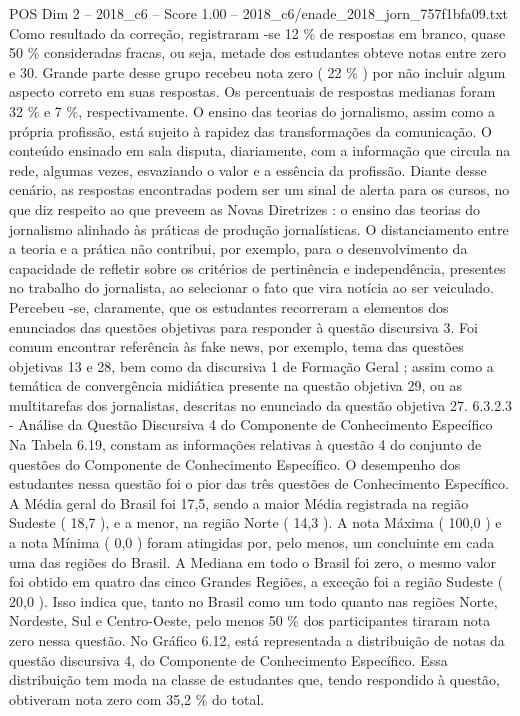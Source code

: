 \begin{textsample}{POS Dim 2 – 2018\_c6 – Score 1.00 – 2018\_c6/enade\_2018\_jorn\_757f1bfa09.txt}
Como resultado da correção, registraram -se 12 \% de respostas em branco, quase 50 \% consideradas fracas, ou seja, metade dos estudantes obteve notas entre zero e 30.
Grande parte desse grupo recebeu nota zero ( 22 \% ) por não incluir algum aspecto correto em suas respostas.
Os percentuais de respostas medianas foram 32 \% e 7 \%, respectivamente.
O ensino das teorias do jornalismo, assim como a própria profissão, está sujeito à rapidez das transformações da comunicação.
O conteúdo ensinado em sala disputa, diariamente, com a informação que circula na rede, algumas vezes, esvaziando o valor e a essência da profissão.
Diante desse cenário, as respostas encontradas podem ser um sinal de alerta para os cursos, no que diz respeito ao que preveem as Novas Diretrizes : o ensino das teorias do jornalismo alinhado às práticas de produção jornalísticas.
O distanciamento entre a teoria e a prática não contribui, por exemplo, para o desenvolvimento da capacidade de refletir sobre os critérios de pertinência e independência, presentes no trabalho do jornalista, ao selecionar o fato que vira notícia ao ser veiculado.
Percebeu -se, claramente, que os estudantes recorreram a elementos dos enunciados das questões objetivas para responder à questão discursiva 3.
Foi comum encontrar referência às fake news, por exemplo, tema das questões objetivas 13 e 28, bem como da discursiva 1 de Formação Geral ; assim como a temática de convergência midiática presente na questão objetiva 29, ou as multitarefas dos jornalistas, descritas no enunciado da questão objetiva 27. 6.3.2.3 - Análise da Questão Discursiva 4 do Componente de Conhecimento Específico Na Tabela 6.19, constam as informações relativas à questão 4 do conjunto de questões do Componente de Conhecimento Específico.
O desempenho dos estudantes nessa questão foi o pior das três questões de Conhecimento Específico.
A Média geral do Brasil foi 17,5, sendo a maior Média registrada na região Sudeste ( 18,7 ), e a menor, na região Norte ( 14,3 ).
A nota Máxima ( 100,0 ) e a nota Mínima ( 0,0 ) foram atingidas por, pelo menos, um concluinte em cada uma das regiões do Brasil.
A Mediana em todo o Brasil foi zero, o mesmo valor foi obtido em quatro das cinco Grandes Regiões, a exceção foi a região Sudeste ( 20,0 ).
Isso indica que, tanto no Brasil como um todo quanto nas regiões Norte, Nordeste, Sul e Centro-Oeste, pelo menos 50 \% dos participantes tiraram nota zero nessa questão.
No Gráfico 6.12, está representada a distribuição de notas da questão discursiva 4, do Componente de Conhecimento Específico.
Essa distribuição tem moda na classe de estudantes que, tendo respondido à questão, obtiveram nota zero com 35,2 \% do total.

\end{textsample}
